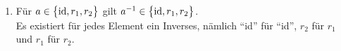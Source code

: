 \documentclass{scrreprt}
\begin{document}
\begin{enumerate}[(1)]
\begin{enumerate}[1)]
     \begin{multicols}{3}
       \begin{itemize}
       \item $\text{id} \circ \text{id} = \text{id}$
       \item $\text{id} \circ r_1 = r_1$
       \item $\text{id} \circ r_2 = r_2$
       \item $r_1 \circ \text{id} = r_1$
       \item $r_1 \circ r_1 = r_2$
       \item $r_1 \circ r_2 = \text{id}$
       \item $r_2 \circ \text{id} = r_2$
       \item $r_2 \circ r_1 = \text{id}$
       \item $r_2 \circ r_2 = r_1$
       \end{itemize}
     \end{multicols}
  \item Für $a \in \qty\big{\text{id}, r_1, r_2}$ gilt
    $a^{-1} \in \qty\big{\text{id}, r_1, r_2}$. \\
    Es existiert für jedes Element ein Inverses, nämlich
    ``id'' für ``id'', $r_2$ für $r_1$ und $r_1$ für $r_2$.
  \end{enumerate}
\end{enumerate}
\end{document}
